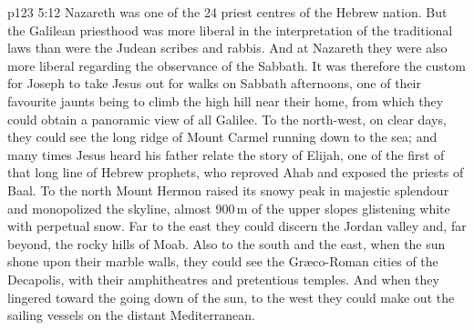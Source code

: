 \vs p123 5:12 \pc Nazareth was one of the 24 priest centres of the Hebrew nation. But the Galilean priesthood was more liberal in the interpretation of the traditional laws than were the Judean scribes and rabbis. And at Nazareth they were also more liberal regarding the observance of the Sabbath. It was therefore the custom for Joseph to take Jesus out for walks on Sabbath afternoons, one of their favourite jaunts being to climb the high hill near their home, from which they could obtain a panoramic view of all Galilee. To the north\hyp{}west, on clear days, they could see the long ridge of Mount Carmel running down to the sea; and many times Jesus heard his father relate the story of Elijah, one of the first of that long line of Hebrew prophets, who reproved Ahab and exposed the priests of Baal. To the north Mount Hermon raised its snowy peak in majestic splendour and monopolized the skyline, almost 900\,m of the upper slopes glistening white with perpetual snow. Far to the east they could discern the Jordan valley and, far beyond, the rocky hills of Moab. Also to the south and the east, when the sun shone upon their marble walls, they could see the Gr\ae co\hyp{}Roman cities of the Decapolis, with their amphitheatres and pretentious temples. And when they lingered toward the going down of the sun, to the west they could make out the sailing vessels on the distant Mediterranean.
